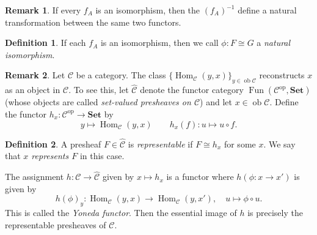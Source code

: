 \documentclass[10pt,letterpaper,cm]{nupset}
\theoremstyle{definition}
\newtheorem*{definition}{Definition}
\newtheorem{remark}{Remark}
\newcommand{\1}{\mathbf{1}}
\renewcommand{\c}{\mathscr{C}}
\newcommand{\0}{\vec 0}
\DeclareMathOperator{\op}{op}
\DeclareMathOperator{\ob}{ob}
\DeclareMathOperator{\Hom}{Hom}
\DeclareMathOperator{\Fun}{Fun}
\begin{document}
\begin{remark}
If every $f_A$ is an isomorphism, then the $(f_A)^{-1}$ define a natural transformation between the same two functors.
\end{remark}

\begin{definition}
If each $f_A$ is an isomorphism, then we call $\phi: F \cong G$ a \textit{natural isomorphism}.
\end{definition}

\begin{remark}
 Let $\c$ be a category.  The class $\{\Hom_{\c}(y, x)\}_{y\in \ob \c}$ reconstructs $x$ as an object in $\c$. To see this, let $\widehat{\c}$ denote the functor category $\Fun(\c^{\op}, \mathbf{Set})$ (whose objects are called \textit{set-valued presheaves on $\c$})  and let $x \in \ob \c$. Define the functor $h_x : \c^{\op} \to \mathbf{Set}$ by $$y \mapsto \Hom_{\c}(y, x) \quad \quad h_x(f) : u \mapsto u \circ f.$$ 
\begin{definition}
A presheaf $F \in \widehat{\c}$ is \textit{representable} if $F \cong h_x$ for some $x$. We say that \textit{$x$ represents $F$} in this case.
\end{definition}
The assignment $h: \c \to \widehat{\c}$ given by $x \mapsto h_x$ is a functor where $h(\phi : x \to x')$ is given by $$h(\phi)_y : \Hom_{\c}(y, x) \to \Hom_{\c}(y, x'), \quad u \mapsto \phi \circ u.$$ This is called the \textit{Yoneda functor}. Then the essential image of $h$ is precisely the representable presheaves of $\c$.
\end{remark}
\end{document}
